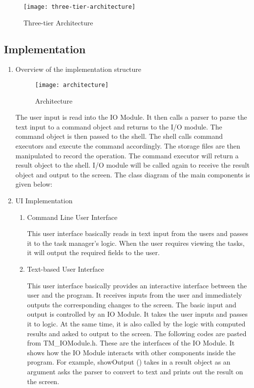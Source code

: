 \documentclass[12pt, a4paper]{article}
\begin{document}
\begin{figure}[h]
  \centering
  \texttt{[image: three-tier-architecture]}
  \caption{Three-tier Architecture}
\end{figure}

\subsection{Implementation}
\begin{enumerate}
\item  Overview of the implementation structure
\begin{figure}[h]
  \centering
  \texttt{[image: architecture]}
  \caption{Architecture}
\end{figure}

The user input is read into the IO Module. It then calls a parser to parse the text input to a
command object and returns to the I/O module. The command object is then passed to the
shell. The shell calls command executors and execute the command accordingly. The storage
files are then manipulated to record the operation. The command executor will return a
result object to the shell. I/O module will be called again to receive the result object and
output to the screen.
The class diagram of the main components is given below:

\item UI Implementation
\begin{enumerate}
\item Command Line User Interface

This user interface basically reads in text input from the users and passes it to the task
manager’s logic. When the user requires viewing the tasks, it will output the required
fields to the user.
\item Text-based User Interface

This user interface basically provides an interactive interface between the user and the
program. It receives inputs from the user and immediately outputs the corresponding
changes to the screen.
The basic input and output is controlled by an IO Module. It takes the user inputs and
passes it to logic. At the same time, it is also called by the logic with computed results
and asked to output to the screen. The following codes are pasted from TM\_IOModule.h.
These are the interfaces of the IO Module. It shows how the IO Module interacts with
other components inside the program. For example, showOutput () takes in a result
object as an argument asks the parser to convert to text and prints out the result on the screen.


\end{enumerate}
\end{enumerate}
\end{document}
